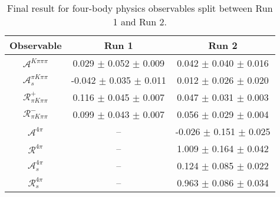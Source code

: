 \begin{table}
\centering
\begin{tabular}{ccc}
Observable & Run 1 & Run 2\\
\midrule
$\mathcal{A}^{K\pi\pi\pi}$ & 0.029 $\pm$ 0.052 $\pm$ 0.009 & 0.042 $\pm$ 0.040 $\pm$ 0.016 \\
$\mathcal{A}_s^{\pi K\pi\pi}$ & -0.042 $\pm$ 0.035 $\pm$ 0.011 & 0.012 $\pm$ 0.026 $\pm$ 0.020 \\
$\mathcal{R}_{\pi K\pi\pi}^+$ & 0.116 $\pm$ 0.045 $\pm$ 0.007 & 0.047 $\pm$ 0.031 $\pm$ 0.003 \\
$\mathcal{R}_{\pi K\pi\pi}^-$ & 0.099 $\pm$ 0.043 $\pm$ 0.007 & 0.056 $\pm$ 0.029 $\pm$ 0.004 \\
$\mathcal{A}^{4\pi}$ & -- & -0.026 $\pm$ 0.151 $\pm$ 0.025 \\
$\mathcal{R}^{4\pi}$ & -- & 1.009 $\pm$ 0.164 $\pm$ 0.042 \\
$\mathcal{A}_s^{4\pi}$ & -- & 0.124 $\pm$ 0.085 $\pm$ 0.022 \\
$\mathcal{R}_{s}^{4\pi}$ & -- & 0.963 $\pm$ 0.086 $\pm$ 0.034 \\
\end{tabular}
\caption{Final result for four-body physics observables split between Run 1 and Run 2.}
\label{tab:results_splitObs_fourBody}
\end{table}
